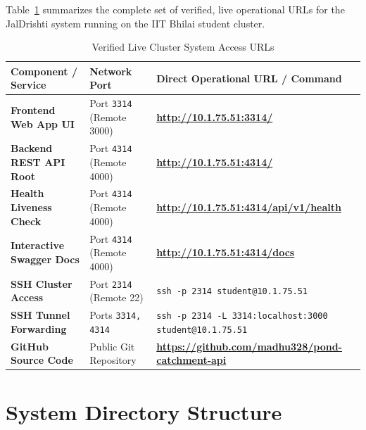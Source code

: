 \documentclass[11pt,a4paper]{article}
\begin{document}
Table~\ref{tab:live_urls} summarizes the complete set of verified, live operational URLs for the JalDrishti system running on the IIT Bhilai student cluster.

\begin{table}[H]
\centering
\small
\caption{Verified Live Cluster System Access URLs}
\label{tab:live_urls}
\vspace{-0.2cm}
\begin{tabularx}{\linewidth}{llX}
\toprule
\textbf{Component / Service} & \textbf{Network Port} & \textbf{Direct Operational URL / Command} \\
\midrule
\textbf{Frontend Web App UI} & Port \texttt{3314} (Remote 3000) & \textbf{\url{http://10.1.75.51:3314/}} \\
\textbf{Backend REST API Root} & Port \texttt{4314} (Remote 4000) & \textbf{\url{http://10.1.75.51:4314/}} \\
\textbf{Health Liveness Check} & Port \texttt{4314} (Remote 4000) & \textbf{\url{http://10.1.75.51:4314/api/v1/health}} \\
\textbf{Interactive Swagger Docs} & Port \texttt{4314} (Remote 4000) & \textbf{\url{http://10.1.75.51:4314/docs}} \\
\textbf{SSH Cluster Access} & Port \texttt{2314} (Remote 22) & \texttt{ssh -p 2314 student@10.1.75.51} \\
\textbf{SSH Tunnel Forwarding} & Ports \texttt{3314, 4314} & \texttt{ssh -p 2314 -L 3314:localhost:3000 student@10.1.75.51} \\
\textbf{GitHub Source Code} & Public Git Repository & \textbf{\url{https://github.com/madhu328/pond-catchment-api}} \\
\bottomrule
\end{tabularx}
\end{table}

\section{System Directory Structure}
\label{sec:appendix_dirs}
\end{document}
